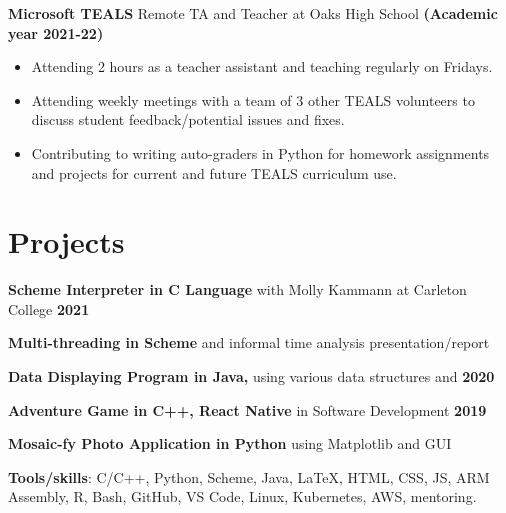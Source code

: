 \documentclass[12pt, letterpaper]{article}
\begin{document}
\noindent
\normalsize{}\textbf{Microsoft TEALS} Remote TA and Teacher at Oaks High School \hfill \textbf{(Academic year 2021-22)} \vspace{-0.6em}
\begin{itemize}
    \item Attending 2 hours as a teacher assistant and teaching regularly on Fridays.     \vspace{-0.6em}
    \item Attending weekly meetings with a team of 3 other TEALS volunteers to discuss student feedback/potential issues and fixes.     \vspace{-0.6em}
    \item Contributing to writing auto-graders in Python for homework assignments and projects for current and future TEALS curriculum use.  \vspace{-0.6em}
\end{itemize}
\vspace{-1.5em}
\section*{\large{Projects}}\vspace{-0.5em}\hline\vspace{0.5em}
\noindent
\textbf{Scheme Interpreter in C Language} with Molly Kammann at Carleton College \hfill \textbf{2021}

\noindent
\textbf{Multi-threading in Scheme} and informal time analysis presentation/report \hfill

\noindent
\textbf{Data Displaying Program in Java, } using various data structures and \hfill \textbf{2020}

\noindent
\textbf{Adventure Game in C++, React Native} in Software Development \hfill \textbf{2019}

\noindent
\textbf{Mosaic-fy Photo Application in Python} using Matplotlib and GUI \hfill \textbf{}
\vspace{0.5em}


\hline\vspace{0.5em}
\noindent
\textbf{Tools/skills}: C/C++, Python, Scheme, Java, \LaTeX, HTML, CSS, JS, ARM Assembly, R, Bash, GitHub, VS Code, Linux, Kubernetes, AWS, mentoring.\vspace{0.2em}
\end{document}

